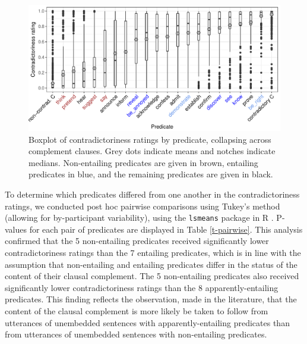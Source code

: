 \documentclass[11pt,fleqn]{article}
\newcommand{\6}{\mbox{$[\hspace*{-.6mm}[$}}
\newcommand{\9}{\mbox{$]\hspace*{-.6mm}]$}}
\begin{document}
\begin{figure}[h!]
\centering

\includegraphics[width=.8\paperwidth]{../results/2-veridicality2/graphs/boxplot-veridicality}

\caption{Boxplot of contradictoriness ratings by predicate, collapsing across complement clauses. Grey dots indicate means and notches indicate medians. Non-entailing predicates are given in brown, entailing predicates in blue, and the remaining predicates are given in black.}
\label{f-veridicality-predicate}
\end{figure}

To determine which predicates differed from one another in the contradictoriness ratings, we conducted post hoc pairwise comparisons using Tukey's method (allowing for by-participant variability), using the \verb|lsmeans| package \citep{tukey} in R \citep{r}. P-values for each pair of predicates are displayed in Table \ref{t-pairwise}. This analysis confirmed that the 5 non-entailing predicates received significantly lower contradictoriness ratings than the 7 entailing predicates, which is in line with the assumption that non-entailing and entailing predicates differ in the status of the content of their clausal complement. The 5 non-entailing predicates also received significantly lower contradictoriness ratings than the 8 apparently-entailing predicates. This finding reflects the observation, made in the literature, that the content of the clausal complement is more likely be taken to follow from utterances of unembedded sentences with apparently-entailing predicates than from utterances of unembedded sentences with non-entailing predicates. 
\end{document}
